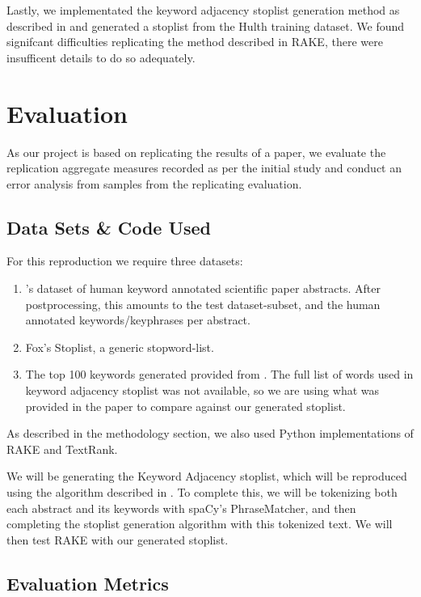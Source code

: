 \documentclass[11pt,a4paper]{article}
\begin{document}
Lastly, we implementated the keyword adjacency stoplist generation method as described in \citet{1} and generated a stoplist from the Hulth training dataset. We found signifcant difficulties replicating the method described in RAKE, there were insufficent details to do so adequately. 

\section{Evaluation}

As our project is based on replicating the results of a paper, we evaluate the replication aggregate measures recorded as per the initial study and conduct an error analysis from samples from the replicating evaluation. 

\subsection{Data Sets \& Code Used}
For this reproduction we require three datasets:

\begin{enumerate}
\item \citet{hulth-2003-improved}'s dataset of human keyword annotated scientific paper abstracts. After postprocessing, this amounts to the test dataset-subset, and the human annotated keywords/keyphrases per abstract.
\item Fox's Stoplist, a generic stopword-list.
\item The top 100 keywords generated provided from . The full list of words used in  keyword adjacency stoplist was not available, so we are using what was provided in the paper to compare against our generated stoplist. 
\end{enumerate}  

As described in the methodology section, we also used Python implementations of RAKE and TextRank. 

We will be generating the Keyword Adjacency stoplist, which will be reproduced using the algorithm described in \citet{hulth-2003-improved}. To complete this, we will be tokenizing both each abstract and its keywords with spaCy's PhraseMatcher, and then completing the stoplist generation algorithm with this tokenized text. We will then test RAKE with our generated stoplist.

\subsection{Evaluation Metrics}
\end{document}
